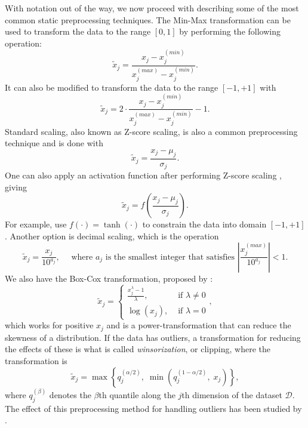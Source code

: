 \documentclass{statsmsc}
\begin{document}
{With notation out of the way, we now proceed with describing some of the most common
static preprocessing techniques.  The Min-Max transformation can be
used to transform the data to the range $[0, 1]$ by performing the following operation:
\begin{equation}\label{eq:pp1}
    \tilde{x}_j = \frac{x_j-x_j^{(min)}}{x_j^{(max)}-x_j^{(min)}} .
\end{equation}
It can also be modified to transform the data to the range $[-1,+1]$ with
\begin{equation}\label{eq:pp2}
    \tilde{x}_j = 2\cdot\frac{x_j-x_j^{(min)}}{x_j^{(max)}-x_j^{(min)}}-1.
\end{equation}
Standard scaling, also known as Z-score scaling, is also a common preprocessing technique and
is done with
\begin{equation}\label{eq:pp3}
    \tilde{x}_j=\frac{x_j-\mu_j}{\sigma_j}.
\end{equation}
One can also apply an activation function after performing Z-score scaling \citep{nawi},
giving
\begin{equation}\label{eq:pp4}
    \tilde{x}_j=f\left(\frac{x_j-\mu_j}{\sigma_j}\right).
\end{equation}
For example, \citeauthor{mixture_ct} use $f(\cdot)=\tanh(\cdot)$ to constrain the data into domain $[-1,+1]$.
Another option is decimal scaling, which is the operation
\begin{equation}\label{eq:pp5}
    \tilde{x}_j=\frac{x_j}{10^{a_j}}, \quad \textrm{ where } a_j
    \textrm{ is the smallest integer that satisfies }
        \left|\frac{x_j^{(max)}}{10^{a_j}}  \right|<1.
\end{equation}
We also have the Box-Cox transformation, proposed by \citeauthor{boxcox}:
\begin{equation}\label{eq:pp6}
    \tilde{x}_j=\left\{
        \begin{array}{ll}
            \frac{x_j^\lambda-1}{\lambda}, & \textrm{ if } \lambda \neq 0 \\
            \log(x_j), & \textrm{ if } \lambda=0
        \end{array}
    \right.,
\end{equation}
which works for positive $x_j$ and is a power-transformation that can reduce the skewness of
a distribution.  If the data has outliers, a transformation for reducing the effects of these
is what is called \textit{winsorization}, or clipping,
where the transformation is
\begin{equation}\label{eq:pp7}
    \tilde{x}_j=\max\left\{q_j^{(\alpha/2)},\;\min\left(q_j^{(1-\alpha/2)},\; x_j\right)\right\},
\end{equation}
where $q_j^{(\beta)}$ denotes the $\beta$th quantile along the $j$th dimension of the dataset
$\mathcal{D}$. The effect of this preprocessing method for handling outliers has been
studied by \cite{winsorization}.

}
\end{document}
